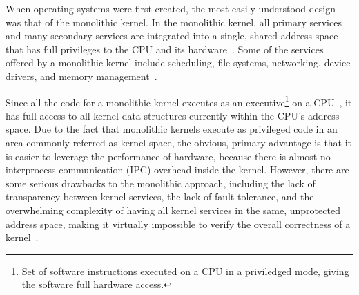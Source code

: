 When operating systems were first created, the most easily understood
design was that of the monolithic kernel.  In the monolithic kernel, all
primary services and many secondary services are integrated into a single,
shared address space that has full privileges to the CPU and its
hardware~\cite{liedtke1996}.  Some of the services offered by a monolithic
kernel include scheduling, file systems, networking, device drivers, and
memory management~\cite{stallings2005}.

Since all the code for a monolithic kernel executes as an
executive\footnote{Set of software instructions executed on a CPU in a
priviledged mode, giving the software full hardware access.}
on a CPU~\cite{ia32-1-2004}, it has full access to all kernel
data structures currently within the CPU's address space.
Due to the fact that monolithic kernels execute as privileged code in an area
commonly referred as kernel-space, the obvious, primary advantage is
that it is easier to leverage the performance of hardware, because there
is almost no interprocess communication (IPC) overhead inside the
kernel.  However, there are some serious drawbacks to the monolithic approach,
including the lack of
transparency between kernel services, the lack of fault tolerance, and the
overwhelming complexity of having all kernel services in the same,
unprotected address space, making it virtually impossible to verify the
overall correctness of a kernel~\cite{stallings2005}.
